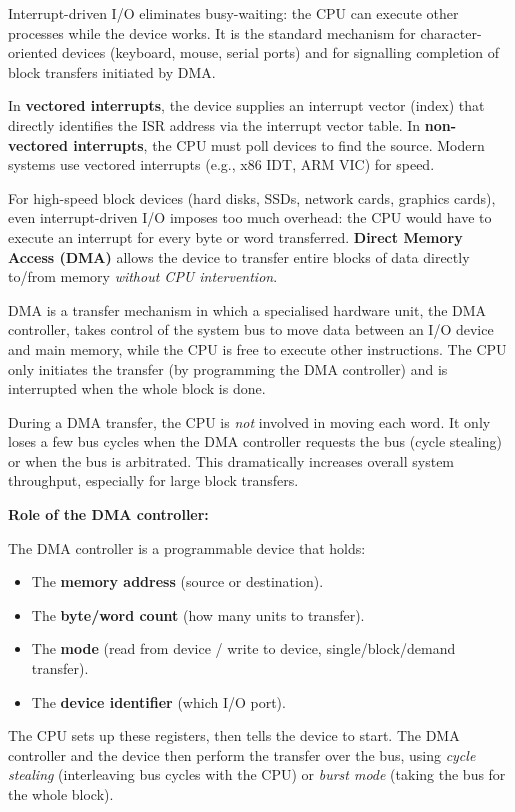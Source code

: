 \documentclass[11pt]{article}
\newcommand{\cle}[1]{{\popxbold\color{popdark}#1}}
\newcounter{popsec}
\newcounter{popsub}
\newcommand{\courssub}[1]{%
  \stepcounter{popsub}%
  \par\vspace{9pt}\noindent{\popxbold\fontsize{11.5}{13}\selectfont\color{popink}{\color{poporange}\thepopsec.\thepopsub}\hspace{6pt}#1}\par\nopagebreak\vspace{4pt}
}
\begin{document}
Interrupt-driven I/O eliminates busy-waiting: the CPU can execute other processes while the device works. It is the standard mechanism for character-oriented devices (keyboard, mouse, serial ports) and for signalling completion of block transfers initiated by DMA.

\begin{propriete}
In \textbf{vectored interrupts}, the device supplies an interrupt vector (index) that directly identifies the ISR address via the interrupt vector table. In \textbf{non-vectored interrupts}, the CPU must poll devices to find the source. Modern systems use vectored interrupts (e.g., x86 IDT, ARM VIC) for speed.
\end{propriete}

\courssub{Direct Memory Access (DMA)}

For high-speed block devices (hard disks, SSDs, network cards, graphics cards), even interrupt-driven I/O imposes too much overhead: the CPU would have to execute an interrupt for every byte or word transferred. \textbf{Direct Memory Access (DMA)} allows the device to transfer entire blocks of data directly to/from memory \emph{without CPU intervention}.

\begin{definition}
\cle{DMA} is a transfer mechanism in which a specialised hardware unit, the \cle{DMA controller}, takes control of the system bus to move data between an I/O device and main memory, while the CPU is free to execute other instructions. The CPU only initiates the transfer (by programming the DMA controller) and is interrupted when the whole block is done.
\end{definition}

\begin{propriete}
During a DMA transfer, the CPU is \emph{not} involved in moving each word. It only loses a few bus cycles when the DMA controller requests the bus (cycle stealing) or when the bus is arbitrated. This dramatically increases overall system throughput, especially for large block transfers.
\end{propriete}

\textbf{Role of the DMA controller:}\par
The DMA controller is a programmable device that holds:
\begin{itemize}
\item The \textbf{memory address} (source or destination).
\item The \textbf{byte/word count} (how many units to transfer).
\item The \textbf{mode} (read from device / write to device, single/block/demand transfer).
\item The \textbf{device identifier} (which I/O port).
\end{itemize}
The CPU sets up these registers, then tells the device to start. The DMA controller and the device then perform the transfer over the bus, using \emph{cycle stealing} (interleaving bus cycles with the CPU) or \emph{burst mode} (taking the bus for the whole block).
\end{document}
